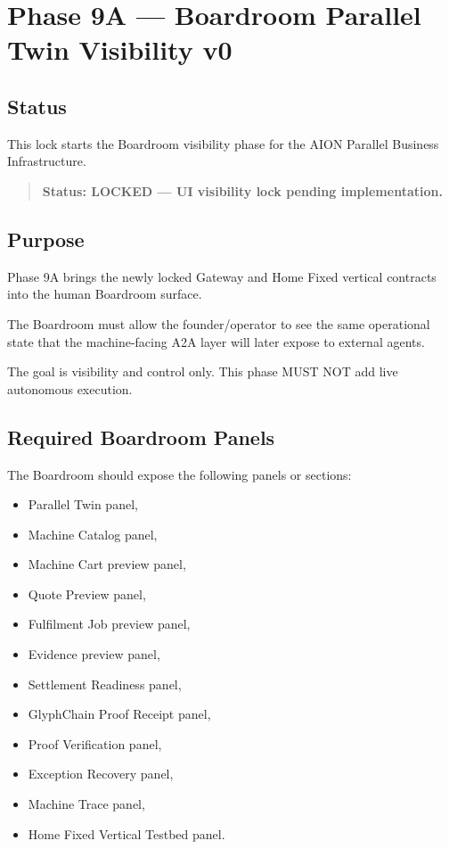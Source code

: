 \section{Phase 9A --- Boardroom Parallel Twin Visibility v0}
\label{sec:aion-boardroom-parallel-twin-visibility-v0}

\subsection{Status}

This lock starts the Boardroom visibility phase for the AION Parallel Business Infrastructure.

\begin{quote}
\textbf{Status: LOCKED --- UI visibility lock pending implementation.}
\end{quote}

\subsection{Purpose}

Phase 9A brings the newly locked Gateway and Home Fixed vertical contracts into the human Boardroom surface.

The Boardroom must allow the founder/operator to see the same operational state that the machine-facing A2A layer will later expose to external agents.

The goal is visibility and control only. This phase MUST NOT add live autonomous execution.

\subsection{Required Boardroom Panels}

The Boardroom should expose the following panels or sections:

\begin{itemize}
  \item Parallel Twin panel,
  \item Machine Catalog panel,
  \item Machine Cart preview panel,
  \item Quote Preview panel,
  \item Fulfilment Job preview panel,
  \item Evidence preview panel,
  \item Settlement Readiness panel,
  \item GlyphChain Proof Receipt panel,
  \item Proof Verification panel,
  \item Exception Recovery panel,
  \item Machine Trace panel,
  \item Home Fixed Vertical Testbed panel.
\end{itemize}

